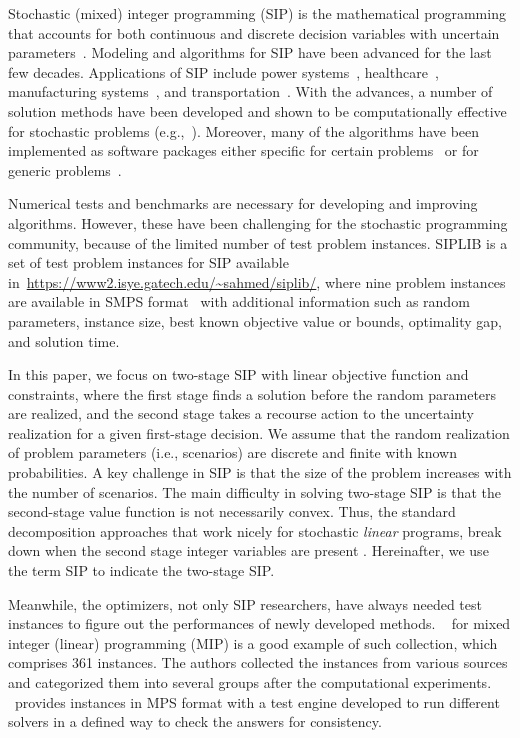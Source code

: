 Stochastic (mixed) integer programming (SIP) is the mathematical programming that accounts for 
both continuous and discrete decision variables with uncertain parameters~\cite{book:BL2011}. 
Modeling and algorithms for SIP have been advanced for the last few decades. Applications of SIP include power systems~\cite{?}, healthcare~\cite{?}, manufacturing systems~\cite{?}, and transportation~\cite{?}. With the advances, a number of solution methods have been developed and shown to be computationally effective for stochastic problems (e.g.,~\cite{?}). Moreover, many of the algorithms have been implemented as software packages either specific for certain problems~\cite{?} or for generic problems~\cite{?}.

Numerical tests and benchmarks are necessary for developing and improving algorithms. However,
these have been challenging for the stochastic programming community, because of the limited number of test problem instances. SIPLIB is a set of test problem instances for SIP available in~\url{https://www2.isye.gatech.edu/~sahmed/siplib/}, where nine problem instances are available in SMPS format~\cite{?} with additional information such as random parameters, 
instance size, best known objective value or bounds, optimality gap, and solution time.  

In this paper, we focus on two-stage SIP with 
linear objective function and constraints, where the first stage finds a solution before the 
random parameters are realized, and the second stage takes a recourse action to the 
uncertainty realization for a given first-stage decision. We assume that the random realization of problem parameters (i.e., scenarios) are discrete and finite with known probabilities.
A key challenge in SIP is that the size of
the problem increases with the number of scenarios. The main difficulty in solving two-stage SIP is that the 
second-stage value function is not necessarily convex. Thus, the standard decomposition 
approaches that work nicely for stochastic \textit{linear} programs, break down when the 
second stage integer variables are present \cite{journal:AG2004}. Hereinafter, we use the 
term SIP to indicate the two-stage SIP. 


Meanwhile, the optimizers, not only SIP researchers, have always needed test instances to 
figure out the performances of newly developed methods. \miplib\ \cite{MIPLIB} for mixed 
integer (linear) programming (MIP) is a good example of such collection, which comprises 361 
instances. The authors collected the instances from various sources and categorized them into 
several groups after the computational experiments. \miplib\ provides instances in 
\textsf{MPS} format with a test engine developed to run different solvers in a defined way to 
check the answers for consistency. 

